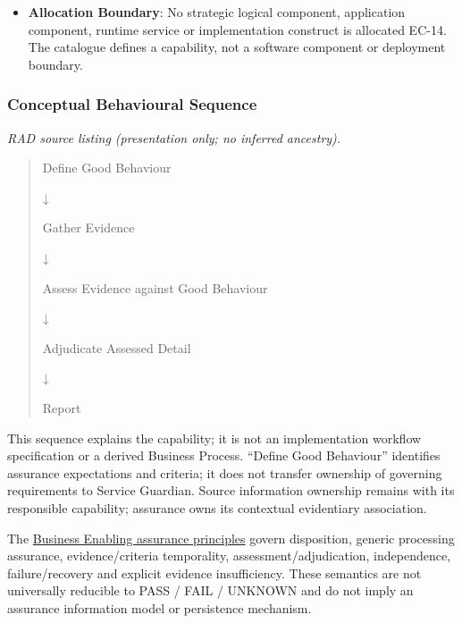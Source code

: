 \begin{itemize}
\item
\textbf{Allocation Boundary}: No strategic logical component, application component, runtime service or implementation construct is allocated EC-14. The catalogue defines a capability, not a software component or deployment boundary.



\end{itemize}
\label{rad:enterprise:236}
\subsubsection*{Conceptual Behavioural Sequence}
\label{rad:enterprise:238}

\textit{RAD source listing (presentation only; no inferred ancestry).}
\begin{quote}
Define Good Behaviour

↓

Gather Evidence

↓

Assess Evidence against Good Behaviour

↓

Adjudicate Assessed Detail

↓

Report
\end{quote}
\label{rad:enterprise:250}

This sequence explains the capability; it is not an implementation workflow specification or a derived Business Process. “Define Good Behaviour” identifies assurance expectations and criteria; it does not transfer ownership of governing requirements to Service Guardian. Source information ownership remains with its responsible capability; assurance owns its contextual evidentiary association.

\label{rad:enterprise:252}

The \hyperref[rad:enabling:674]{Business Enabling assurance principles} govern disposition, generic processing assurance, evidence/\allowbreak{}criteria temporality, assessment/\allowbreak{}adjudication, independence, failure/\allowbreak{}recovery and explicit evidence insufficiency. These semantics are not universally reducible to PASS /\allowbreak{} FAIL /\allowbreak{} UNKNOWN and do not imply an assurance information model or persistence mechanism.

\label{rad:enterprise:254}

\par\smallskip
{}\label{rad:enterprise:256}
